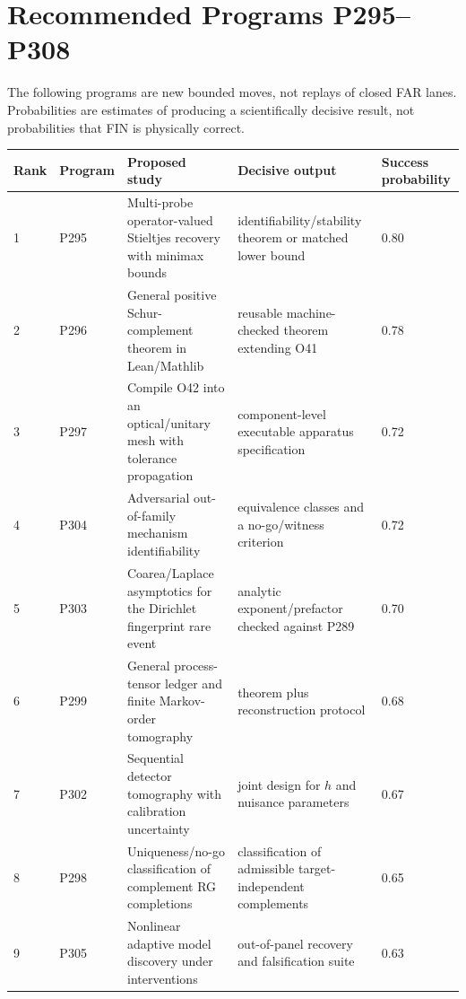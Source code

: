 \documentclass[11pt,a4paper,openany]{report}
\begin{document}
\chapter{Recommended Programs P295--P308}

The following programs are new bounded moves, not replays of closed FAR lanes. Probabilities are estimates of producing a scientifically decisive result, not probabilities that FIN is physically correct.

\begin{center}
\begingroup\fontsize{7}{8.4}\selectfont
\setlength{\tabcolsep}{2.5pt}
\renewcommand{\arraystretch}{1.16}
\begin{longtable}{@{}p{}p{}p{}p{}p{}@{}}
\toprule
\textbf{Rank} & \textbf{Program} & \textbf{Proposed study} & \textbf{Decisive output} & \textbf{Success probability} \\
\midrule
\endhead
1 & P295 & Multi-probe operator-valued Stieltjes recovery with minimax bounds & identifiability/\allowbreak{}stability theorem or matched lower bound & 0.80 \\
2 & P296 & General positive Schur-complement theorem in Lean/\allowbreak{}Mathlib & reusable machine-checked theorem extending O41 & 0.78 \\
3 & P297 & Compile O42 into an optical/\allowbreak{}unitary mesh with tolerance propagation & component-level executable apparatus specification & 0.72 \\
4 & P304 & Adversarial out-of-family mechanism identifiability & equivalence classes and a no-go/\allowbreak{}witness criterion & 0.72 \\
5 & P303 & Coarea/\allowbreak{}Laplace asymptotics for the Dirichlet fingerprint rare event & analytic exponent/\allowbreak{}prefactor checked against P289 & 0.70 \\
6 & P299 & General process-tensor ledger and finite Markov-order tomography & theorem plus reconstruction protocol & 0.68 \\
7 & P302 & Sequential detector tomography with calibration uncertainty & joint design for \(h\) and nuisance parameters & 0.67 \\
8 & P298 & Uniqueness/\allowbreak{}no-go classification of complement RG completions & classification of admissible target-independent complements & 0.65 \\
9 & P305 & Nonlinear adaptive model discovery under interventions & out-of-panel recovery and falsification suite & 0.63 \\

\end{longtable}
\end{center}
\end{document}
